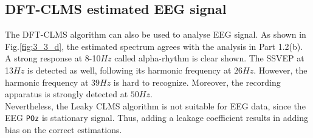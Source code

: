 \subsection{DFT-CLMS estimated EEG signal}
The DFT-CLMS algorithm can also be used to analyse EEG signal. As shown in Fig.\ref{fig:3_3_d}, the estimated spectrum agrees with the analysis in Part 1.2(b). A strong response at 8-10$Hz$ called alpha-rhythm is clear shown. The SSVEP at 13$Hz$ is detected as well, following its harmonic frequency at $26Hz$. However, the harmonic frequency at $39Hz$ is hard to recognize. Moreover, the recording apparatus is strongly detected at $50Hz$.\\
Nevertheless, the Leaky CLMS algorithm is not suitable for EEG data, since the EEG \texttt{POz} is stationary signal. Thus, adding a leakage coefficient results in adding bias on the correct estimations.
